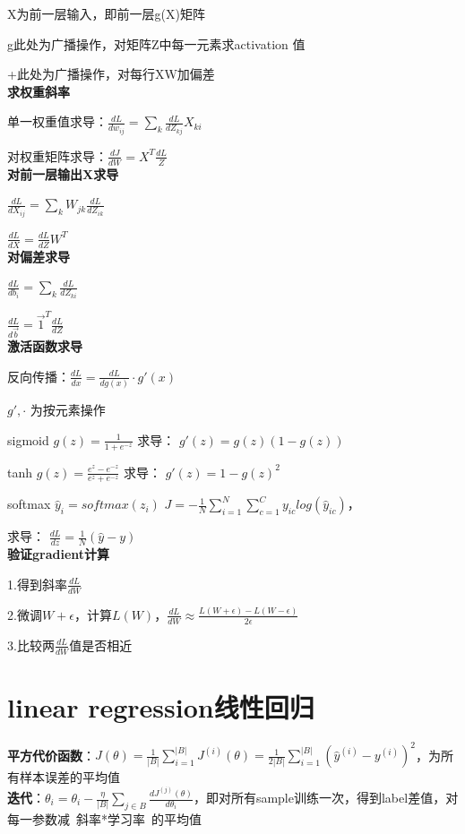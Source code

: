 \documentclass[UTF8]{ctexart}
\begin{document}
  X为前一层输入，即前一层g(X)矩阵
  
  g此处为广播操作，对矩阵Z中每一元素求activation 值
  
  +此处为广播操作，对每行XW加偏差\\
\textbf{求权重斜率}
  
  单一权重值求导：$\frac{dL}{dw_{ij}} = \sum_k \frac{dL}{dZ_{kj}} X_{ki}$

  对权重矩阵求导：$\frac{dJ}{dW} = X^T\frac{dL}{Z}$\\
\textbf{对前一层输出X求导}

  $\frac{dL}{dX_{ij}} = \sum_k W_{jk}\frac{dL}{dZ_{ik}}$

  $\frac{dL}{dX} = \frac{dL}{dZ}W^T$\\
\textbf{对偏差求导}

  $\frac{dL}{db_i} = \sum_k \frac{dL}{dZ_{ki}}$

  $\frac{dL}{d\vec{b}} = \vec{1}^T\frac{dL}{dZ}$\\
\textbf{激活函数求导}

  反向传播：$\frac{dL}{dx} = \frac{dL}{dg(x)} \cdot g'(x)$
  
  \quad $g', \cdot$ 为按元素操作

  sigmoid $g(z) = \frac{1}{1 + e^{-z}}$ 求导： $g'(z) = g(z)(1 - g(z))$

  tanh $g(z) = \frac{e^z - e^{-z}}{e^z + e^{-z}}$ 求导： $g'(z) = 1 - g(z)^2$

  softmax $\hat{y}_i = softmax(z_i)$ $J = -\frac{1}{N}\sum_{i=1}^{N}\sum_{c=1}^{C}y_{ic}log(\hat{y}_{ic})$，
  
  \quad 求导： $\frac{dL}{dz} = \frac{1}{N}(\hat{y} - y)$\\
\textbf{验证gradient计算}

  1.得到斜率$\frac{dL}{dW}$

  2.微调$W + \epsilon$，计算$L(W)$，$\frac{dL}{dW} \approx \frac{L(W + \epsilon) - L(W - \epsilon)}{2\epsilon}$

  3.比较两$\frac{dL}{dW}$值是否相近

\section{linear regression线性回归}
\noindent \textbf{平方代价函数}：$J(\theta ) = \frac{1}{|B|} \sum_{i = 1}^{|B|} J^{(i)}(\theta ) = \frac{1}{2|B|} \sum_{i = 1}^{|B|} (\hat{y}^{(i)} - y^{(i)})^2  $，为所有样本误差的平均值\\
\textbf{迭代}：$\theta_i = \theta_i - \frac{\eta}{|B|}\sum_{j\in B} \frac{d J^{(j)}(\theta)}{d \theta_i}$，即对所有sample训练一次，得到label差值，对每一参数减\ 斜率*学习率\ 的平均值
  
\end{document}
